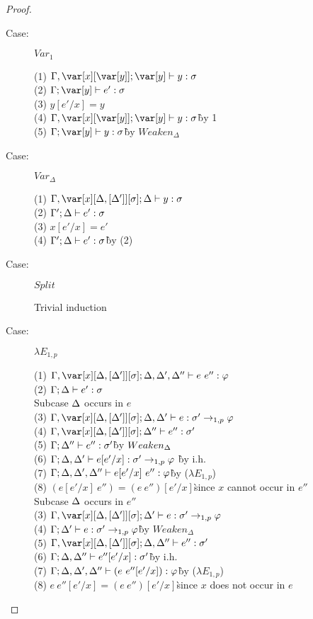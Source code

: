 \begin{proof}
\begin{description}
\item[Case:] $Var_1$
\begin{tabbing}
  (1) $\G,\x[\y]; \y \vdash y : \s$\\
  (2) $\G; \y \vdash e' : \s$\\
  (3) $y[e'/x] = y$\\
  (4) $\G,\x[\y]; \y \vdash y : \s$\`by 1\\ 
  (5) $\G; \y\vdash y : \s$\` by $Weaken_\Delta$\\
\end{tabbing}

\item[Case:] $Var_\Delta$
\begin{tabbing}
    (1) $\G, \xD; \D \vdash y : \s$\\
    (2) $\Gamma'; \Delta \vdash e' : \sigma$\\
    (3) $x[e'/x] = e'$\\
    (4) $\Gamma'; \Delta \vdash e' : \sigma$\` by (2)\\
\end{tabbing}

\item[Case:] $Split$
\begin{tabbing}
    Trivial induction
\end{tabbing}

\item[Case:] $\lambda E_{1,p}$
\begin{tabbing}
    (1) $\G, \xD; \D,\D',\D'' \vdash e~e'' : \varphi$\\
    (2) $\Gamma; \Delta \vdash e' : \sigma$\\
    Subcase $\Delta$ occurs in $e$\\
    (3) $\G, \xD; \D,\D' \vdash e : \s' \to_{1,p} \vp$\\
    (4) $\G, \xD; \D'' \vdash e'' : \s'$\\
    (5) $\Gamma; \Delta'' \vdash e'' : \sigma'$\` by $Weaken_\Delta$\\
    (6) $\Gamma; \Delta,\Delta' \vdash e[e'/x] : \sigma' \to_{1,p} \varphi$ \` by i.h.\\
    (7) $\Gamma;\Delta, \Delta', \Delta'' \vdash e[e'/x]~e'' : \varphi$\` by ($\lambda E_{1,p}$)\\
    (8) $(e[e'/x]~e'')=(e~e'')[e'/x]$\` since $x$ cannot occur in $e''$\\
    Subcase $\Delta$ occurs in $e''$\\
    (3) $\G, \xD; \D' \vdash e : \s' \to_{1,p} \vp$\\
    (4) $\Gamma; \Delta' \vdash e : \sigma' \to_{1,p} \varphi$\` by $Weaken_\Delta$\\
    (5) $\G,\xD; \D, \D'' \vdash e'' : \s'$\\
    (6) $\Gamma; \Delta, \Delta'' \vdash e''[e'/x] : \sigma'$\` by i.h.\\
    (7) $\Gamma; \Delta,\Delta',\Delta'' \vdash (e~e''[e'/x]) : \varphi$\` by ($\lambda E_{1,p}$)\\
    (8) $e~e''[e'/x] = (e~e'')[e'/x]$\`since $x$ does not occur in $e$\\


\end{tabbing}
\end{description}
\end{proof}
